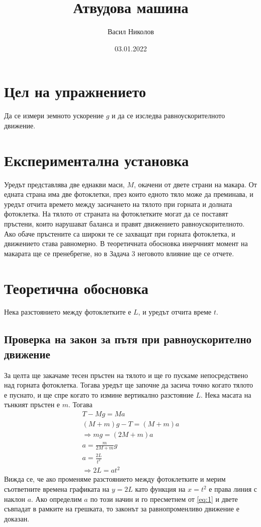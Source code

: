 \documentclass[aps, prb, twocolumn, a4paper, floatfix, reprint]{revtex4-2}
\begin{document}
\title{Атвудова машина}
\author{Васил Николов}
\noaffiliation
\date{03.01.2022}
\maketitle

\section{Цел на упражнението}
Да се измери земното ускорение $g$ и да се изследва равноускорителното движение. 

\section{Експериментална установка}
Уредът представлява две еднакви маси, $M$, окачени от двете страни на макара. От едната страна има две фотоклетки, през които едното тяло може да преминава, и уредът отчита времето между засичането на тялото при горната и долната фотоклетка. На тялото от страната на фотоклетките могат да се поставят пръстени, които нарушават баланса и правят движението равноускорителното. Ако обаче пръстените са широки те се захващат при горната фотоклетка, и движението става равномерно. В теоретичната обосновка инерчният момент на макарата ще се пренебрегне, но в Задача 3 неговото влияние ще се отчете. 

\section{Теоретична обосновка}
Нека разстоянието между фотоклетките е $L$, и уредът отчита време $t$. 
\subsection{Проверка на закон за пътя при равноускорително движение}
За целта ще закачаме тесен пръстен на тялото и ще го пускаме непосредствено над горната фотоклетка. Тогава уредът ще започне да засича точно когато тялото е пуснато, и ще спре когато то измине вертикално разстояние $L$. Нека масата на тънкият пръстен е $m$. Тогава
\begin{gather*}
    T - Mg = Ma \\
    (M + m)g - T = (M+m)a\\
    \Rightarrow mg = (2M + m)a \\
    a = \frac{m}{2M + m}g \label{eq:1} \tag{1}\\ 
    a = \frac{2L}{t^2} \\
    \Rightarrow 2L = at^2 \label{eq:2} \tag{2}
\end{gather*}
Вижда се, че ако променяме разстоянието между фотоклетките и мерим съответните времена графиката на $y=2L$ като функция на $x=t^2$ е права линия с наклон $a$. Ако определим $a$ по този начин и го пресметнем от \eqref{eq:1} и двете съвпадат в рамките на грешката, то законът за равнопроменливо движение е доказан. 
\end{document}
